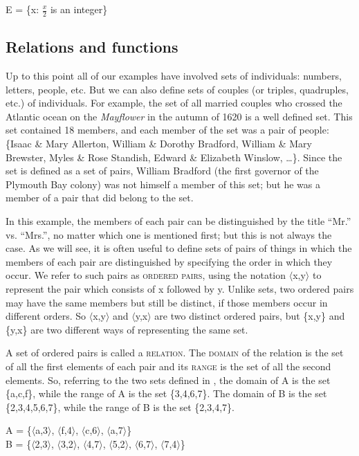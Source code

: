 \ea
E = \{x: $\frac{x}{2}$ is an integer\}
\z

\subsection{Relations and functions}\label{sec:13.3.1}

Up to this point all of our examples have involved sets of individuals: numbers, letters, people, etc. But we can also define sets of couples (or triples, quadruples, etc.) of individuals. For example, the set of all married couples who crossed the Atlantic ocean on the \textit{Mayflower} in the autumn of 1620 is a well defined set. This set contained 18 members, and each member of the set was a pair of people: \{Isaac \& Mary Allerton, William \& Dorothy Bradford, William \& Mary Brewster, Myles \& Rose Standish, Edward \& Elizabeth Winslow, …\}. Since the set is defined as a set of pairs, William Bradford (the first governor of the Plymouth Bay colony) was not himself a member of this set; but he was a member of a pair that did belong to the set.



In this example, the members of each pair can be distinguished by the title “Mr.” vs. “Mrs.”, no matter which one is mentioned first; but this is not always the case. As we will see, it is often useful to define sets of pairs of things in which the members of each pair are distinguished by specifying the order in which they occur. We refer to such pairs as \textsc{ordered pairs}, using the notation $\langle$x,y$\rangle$ to represent the pair which consists of x followed by y. Unlike sets, two ordered pairs may have the same members but still be distinct, if those members occur in different orders. So $\langle$x,y$\rangle$ and $\langle$y,x$\rangle$ are two distinct ordered pairs, but \{x,y\} and \{y,x\} are two different ways of representing the same set.



A set of ordered pairs is called a \textsc{relation}. The \textsc{domain} of the relation is the set of all the first elements of each pair and its \textsc{range} is the set of all the second elements. So, referring to the two sets defined in , the domain of A is the set \{a,c,f\}, while the range of A is the set \{3,4,6,7\}. The domain of B is the set \{2,3,4,5,6,7\}, while the range of B is the set \{2,3,4,7\}. 


\ea
A = \{$\langle$a,3$\rangle$, $\langle$f,4$\rangle$, $\langle$c,6$\rangle$, $\langle$a,7$\rangle$\}\\
B = \{$\langle$2,3$\rangle$, $\langle$3,2$\rangle$, $\langle$4,7$\rangle$, $\langle$5,2$\rangle$, $\langle$6,7$\rangle$, $\langle$7,4$\rangle$\}
\z


